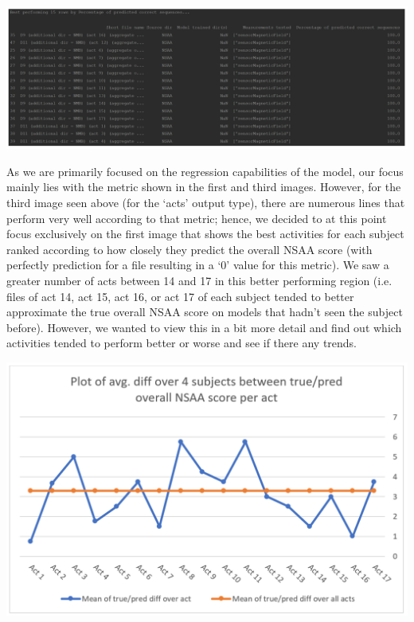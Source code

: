 \documentclass[12pt,twoside]{report}
\begin{document}
\begin{center}
\includegraphics[scale=0.3]{project_figures/fig11_36}
\end{center}

\quad As we are primarily focused on the regression capabilities of the model, our focus mainly lies with the metric shown in the first and third images. However, for the third image seen above (for the ‘acts’ output type), there are numerous lines that perform very well according to that metric; hence, we decided to at this point focus exclusively on the first image that shows the best activities for each subject ranked according to how closely they predict the overall NSAA score (with perfectly prediction for a file resulting in a ‘0’ value for this metric). We saw a greater number of acts between 14 and 17 in this better performing region (i.e. files of act 14, act 15, act 16, or act 17 of each subject tended to better approximate the true overall NSAA score on models that hadn’t seen the subject before). However, we wanted to view this in a bit more detail and find out which activities tended to perform better or worse and see if there any trends.

\begin{center}
\includegraphics[scale=0.3]{project_figures/fig11_37}
\end{center}
\end{document}
